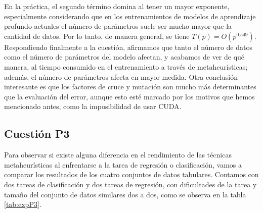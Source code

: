 En la práctica, el segundo término domina al tener un mayor exponente, especialmente considerando que en los entrenamientos de modelos de aprendizaje profundo actuales el número de parámetros suele ser mucho mayor que la cantidad de datos. Por lo tanto, de manera general, se tiene $T(p)=O(p^{0.549})$. Respondiendo finalmente a la cuestión, afirmamos que tanto el número de datos como el número de parámetros del modelo afectan, y acabamos de ver de qué manera, al tiempo consumido en el entrenamiento a través de metaheurísticas; además, el número de parámetros afecta en mayor medida. Otra conclusión interesante es que los factores de cruce y mutación son mucho más determinantes que la evaluación del error, aunque esto esté marcado por los motivos que hemos mencionado antes, como la imposibilidad de usar CUDA.





\subsection{Cuestión P3}

Para observar si existe alguna diferencia en el rendimiento de las técnicas metaheurísticas al enfrentarse a la tarea de regresión o clasificación, vamos a comparar los resultados de los cuatro conjuntos de datos tabulares. Contamos con dos tareas de clasificación y dos tareas de regresión, con dificultades de la tarea y tamaño del conjunto de datos similares dos a dos, como se observa en la tabla \ref{tab:expP3}.

\begin{table}[]
\centering
{}
\caption{Tareas a comparar para la cuestión P3.}
\label{tab:expP3}
\end{table}

